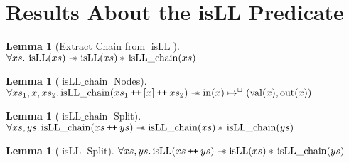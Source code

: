 \documentclass[a4paper, 10pt]{report}
\theoremstyle{definition}
\newtheorem{lemma}[theorem]{Lemma}
\newcommand{\isLLchain}{\operatorname{isLL\_chain}}
\newcommand{\isLL}{\operatorname{isLL}}
\newcommand{\nIn}[1]{\operatorname{in}(#1)}
\newcommand{\nVal}[1]{\operatorname{val}(#1)}
\newcommand{\nOut}[1]{\operatorname{out}(#1)}
\newcommand\catenate{\mathbin{\text{\ttfamily\upshape ++}}}
\newcommand{\isNode}[1]{\nIn{#1} \mapsto^{\persistently} (\nVal{#1}, \nOut{#1})}
\begin{document}
\section{Results About the isLL Predicate}
\label{appendix:common:section:isll}

\begin{lemma}[Extract Chain from $\isLL$]\label{lemma:isLL-and-chain}
  $\All xs. \isLL(xs) \wand \isLL(xs) \star{} \isLLchain(xs)$
\end{lemma}

\begin{lemma}[$\isLLchain$ Nodes]\label{lemma:isLL-chain-nodes}
  $\All xs_1, x, xs_2.\\
   \isLLchain(xs_1 \catenate [x] \catenate xs_2) \wand \isNode{x}$
\end{lemma}

\begin{lemma}[$\isLLchain$ Split]\label{lemma:isLL-chain-split}
  $\All xs, ys.\\
   \isLLchain(xs \catenate ys) \wand \isLLchain(xs) \star{} \isLLchain(ys)$
\end{lemma}

\begin{lemma}[$\isLL$ Split]\label{lemma:isLL-split}
  $\All xs, ys.\\
   \isLL(xs \catenate ys) \wand \isLL(xs) \star{} \isLLchain(ys)$
\end{lemma}
\end{document}
